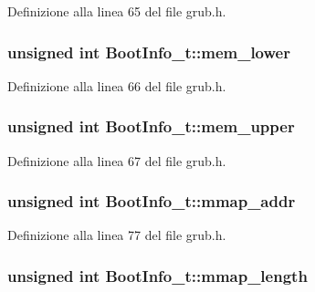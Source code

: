 Definizione alla linea 65 del file grub.\+h.

\hypertarget{structBootInfo__t_a4b144c9db5fe2c5a9d72522068d65138}{
\subsubsection[{mem\+\_\+lower}]{\setlength{\rightskip}{0pt plus 5cm}unsigned int Boot\+Info\+\_\+t\+::mem\+\_\+lower}}\label{structBootInfo__t_a4b144c9db5fe2c5a9d72522068d65138}


Definizione alla linea 66 del file grub.\+h.

\hypertarget{structBootInfo__t_ab20281f521d626a49714e06b62291be9}{
\subsubsection[{mem\+\_\+upper}]{\setlength{\rightskip}{0pt plus 5cm}unsigned int Boot\+Info\+\_\+t\+::mem\+\_\+upper}}\label{structBootInfo__t_ab20281f521d626a49714e06b62291be9}


Definizione alla linea 67 del file grub.\+h.

\hypertarget{structBootInfo__t_a904e8344d4c4ef9a650305409b933b17}{
\subsubsection[{mmap\+\_\+addr}]{\setlength{\rightskip}{0pt plus 5cm}unsigned int Boot\+Info\+\_\+t\+::mmap\+\_\+addr}}\label{structBootInfo__t_a904e8344d4c4ef9a650305409b933b17}


Definizione alla linea 77 del file grub.\+h.

\hypertarget{structBootInfo__t_ac44eb8289f5f6fbbca78dc24e5052be7}{
\subsubsection[{mmap\+\_\+length}]{\setlength{\rightskip}{0pt plus 5cm}unsigned int Boot\+Info\+\_\+t\+::mmap\+\_\+length}}\label{structBootInfo__t_ac44eb8289f5f6fbbca78dc24e5052be7}


